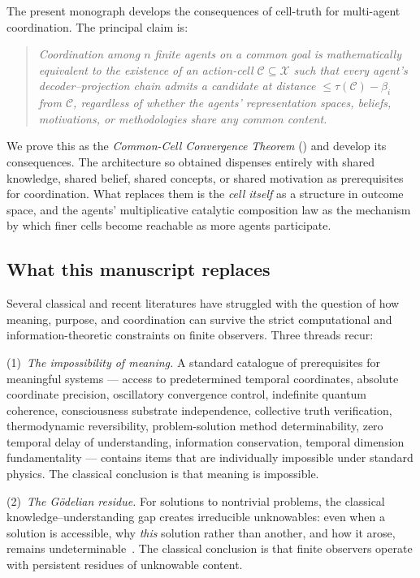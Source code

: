 \documentclass[11pt,a4paper]{article}
\newcommand{\X}{\mathcal{X}}
\newcommand{\Cell}{\mathcal{C}}
\begin{document}
The present monograph develops the consequences of cell-truth for
multi-agent coordination. The principal claim is:

\begin{quote}\itshape
Coordination among $n$ finite agents on a common goal is mathematically
equivalent to the existence of an action-cell $\Cell\subseteq\X$ such
that every agent's decoder--projection chain admits a candidate at
distance $\le\tau(\Cell)-\beta_i$ from $\Cell$, regardless of whether
the agents' representation spaces, beliefs, motivations, or
methodologies share any common content.
\end{quote}

We prove this as the \emph{Common-Cell Convergence Theorem}
() and develop its consequences. The architecture so
obtained dispenses entirely with shared knowledge, shared belief,
shared concepts, or shared motivation as prerequisites for coordination.
What replaces them is the \emph{cell itself} as a structure in outcome
space, and the agents' multiplicative catalytic composition law as the
mechanism by which finer cells become reachable as more agents
participate.

\subsection{What this manuscript replaces}

Several classical and recent literatures have struggled with the
question of how meaning, purpose, and coordination can survive the
strict computational and information-theoretic constraints on finite
observers. Three threads recur:

(1)~\emph{The impossibility of meaning.} A standard catalogue of
prerequisites for meaningful systems --- access to predetermined
temporal coordinates, absolute coordinate precision, oscillatory
convergence control, indefinite quantum coherence, consciousness
substrate independence, collective truth verification, thermodynamic
reversibility, problem-solution method determinability, zero temporal
delay of understanding, information conservation, temporal dimension
fundamentality --- contains items that are individually impossible
under standard physics. The classical conclusion is that meaning is
impossible.

(2)~\emph{The Gödelian residue.} For solutions to nontrivial problems,
the classical knowledge--understanding gap creates irreducible
unknowables: even when a solution is accessible, why \emph{this}
solution rather than another, and how it arose, remains
undeterminable~\cite{godel1931,chaitin1974}. The classical conclusion
is that finite observers operate with persistent residues of unknowable
content.
\end{document}
